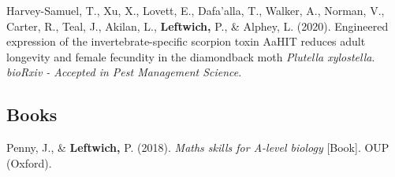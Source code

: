 \documentclass[11pt, a4paper]{awesome-cv}
\begin{document}
\leavevmode\hypertarget{ref-1}{}%
Harvey-Samuel, T., Xu, X., Lovett, E., Dafa'alla, T., Walker, A.,
Norman, V., Carter, R., Teal, J., Akilan, L., \textbf{Leftwich,} P., \&
Alphey, L. (2020). Engineered expression of the invertebrate-specific
scorpion toxin {AaHIT} reduces adult longevity and female fecundity in
the diamondback moth \emph{{Plutella} xylostella}. \emph{bioRxiv -
Accepted in Pest Management Science}.

\hypertarget{books}{%
\subsection{Books}\label{books}}

\hypertarget{refs_proceedings}{}
\leavevmode\hypertarget{ref-1}{}%
Penny, J., \& \textbf{Leftwich,} P. (2018). \emph{Maths skills for
{A-level} biology} {[}Book{]}. OUP (Oxford).
\end{document}
